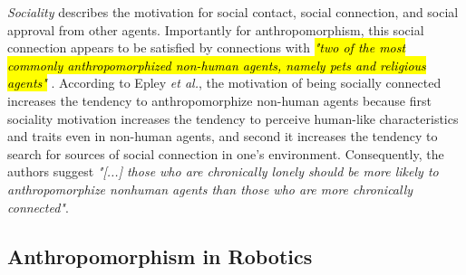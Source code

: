\documentclass[lettersize, apacite, twoside, HRI]{apa_HRI}
\begin{document}
	\textit{Sociality} describes the motivation for social contact, social connection, and social approval from other agents. Importantly for anthropomorphism, this social connection appears to be satisfied by connections with \hl{ \textit{"two of the most commonly anthropomorphized non-human agents, namely pets and religious agents"}} \cite{epley_seeing_2007}. According to Epley \textit{et al.}, the motivation of being socially connected increases the tendency to anthropomorphize non-human agents because first sociality motivation increases the tendency to perceive human-like characteristics and traits even in non-human agents, and second it increases the tendency to search for sources of social connection in one's environment. Consequently, the authors suggest \textit{"[...] those who are chronically lonely should be more likely to anthropomorphize nonhuman agents than those who are more chronically connected"}. 
	

\subsection{Anthropomorphism in Robotics}
\label{sec:anthropomorphism-robotics}
	
\end{document}
